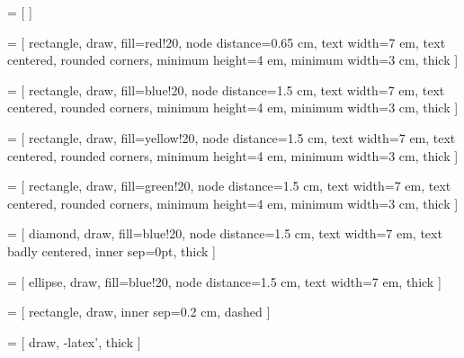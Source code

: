 \documentclass{article}
\begin{document}
 = [
]

 = [
    rectangle,
    draw,
    fill=red!20,
    node distance=0.65 cm,
    text width=7 em,
    text centered,
    rounded corners,
    minimum height=4 em,
    minimum width=3 cm,
    thick
]

 = [
    rectangle,
    draw,
    fill=blue!20,
    node distance=1.5 cm,
    text width=7 em,
    text centered,
    rounded corners,
    minimum height=4 em,
    minimum width=3 cm,
    thick
]

 = [
    rectangle,
    draw,
    fill=yellow!20,
    node distance=1.5 cm,
    text width=7 em,
    text centered,
    rounded corners,
    minimum height=4 em,
    minimum width=3 cm,
    thick
]

 = [
    rectangle,
    draw,
    fill=green!20,
    node distance=1.5 cm,
    text width=7 em,
    text centered,
    rounded corners,
    minimum height=4 em,
    minimum width=3 cm,
    thick
]

 = [
    diamond,
    draw,
    fill=blue!20,
    node distance=1.5 cm,
    text width=7 em,
    text badly centered,
    inner sep=0pt,
    thick
]

 = [
    ellipse,
    draw,
    fill=blue!20,
    node distance=1.5 cm,
    text width=7 em,
    thick
]

 = [
    rectangle,
    draw,
    inner sep=0.2 cm,
    dashed
]

 = [
    draw,
    -latex',
    thick
]
\end{document}
